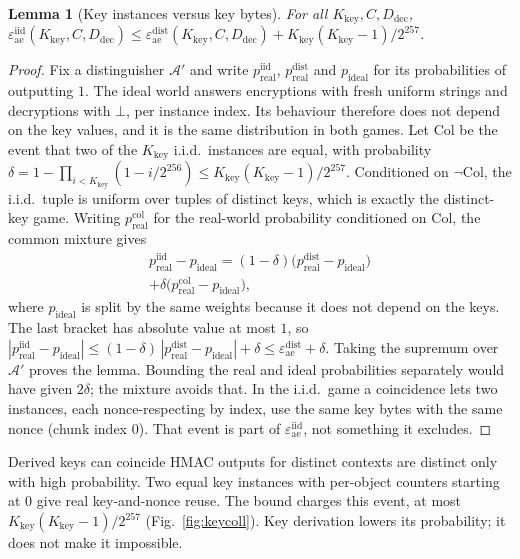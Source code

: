 \documentclass[pdflatex,sn-mathphys-num,twocolumn]{sn-jnl}
\theoremstyle{plain}
\newtheorem{lemma}[theorem]{Lemma}
\theoremstyle{definition}
\begin{document}
\begin{lemma}[Key instances versus key bytes]\label{lem:keycoll}
For all $K_{\mathrm{key}},C,D_{\mathrm{dec}}$, $\varepsilon^{\mathrm{iid}}_{\mathrm{ae}}(K_{\mathrm{key}},C,D_{\mathrm{dec}})\le\varepsilon^{\mathrm{dist}}_{\mathrm{ae}}(K_{\mathrm{key}},C,D_{\mathrm{dec}})+K_{\mathrm{key}}(K_{\mathrm{key}}-1)/2^{257}$.
\end{lemma}
\begin{proof}
Fix a distinguisher $\mathcal A'$ and write $p^{\mathrm{iid}}_{\mathrm{real}}$, $p^{\mathrm{dist}}_{\mathrm{real}}$ and $p_{\mathrm{ideal}}$ for its probabilities of outputting $1$. The ideal world answers encryptions with fresh uniform strings and decryptions with $\bot$, per instance index. Its behaviour therefore does not depend on the key values, and it is the same distribution in both games. Let $\mathrm{Col}$ be the event that two of the $K_{\mathrm{key}}$ i.i.d.\ instances are equal, with probability $\delta=1-\prod_{i<K_{\mathrm{key}}}(1-i/2^{256})\le K_{\mathrm{key}}(K_{\mathrm{key}}-1)/2^{257}$. Conditioned on $\neg\mathrm{Col}$, the i.i.d.\ tuple is uniform over tuples of distinct keys, which is exactly the distinct-key game. Writing $p^{\mathrm{col}}_{\mathrm{real}}$ for the real-world probability conditioned on $\mathrm{Col}$, the common mixture gives
\begin{multline*}
 p^{\mathrm{iid}}_{\mathrm{real}}-p_{\mathrm{ideal}}=(1-\delta)\big(p^{\mathrm{dist}}_{\mathrm{real}}-p_{\mathrm{ideal}}\big)\\
 +\delta\big(p^{\mathrm{col}}_{\mathrm{real}}-p_{\mathrm{ideal}}\big),
\end{multline*}
where $p_{\mathrm{ideal}}$ is split by the same weights because it does not depend on the keys. The last bracket has absolute value at most $1$, so $|p^{\mathrm{iid}}_{\mathrm{real}}-p_{\mathrm{ideal}}|\le(1-\delta)\,|p^{\mathrm{dist}}_{\mathrm{real}}-p_{\mathrm{ideal}}|+\delta\le\varepsilon^{\mathrm{dist}}_{\mathrm{ae}}+\delta$. Taking the supremum over $\mathcal A'$ proves the lemma. Bounding the real and ideal probabilities separately would have given $2\delta$; the mixture avoids that. In the i.i.d.\ game a coincidence lets two instances, each nonce-respecting by index, use the same key bytes with the same nonce (chunk index $0$). That event is part of $\varepsilon^{\mathrm{iid}}_{\mathrm{ae}}$, not something it excludes.
\end{proof}

\begin{warnbox}{Derived keys can coincide}
HMAC outputs for distinct contexts are distinct only with high probability. Two equal key instances with per-object counters starting at $0$ give real key-and-nonce reuse. The bound charges this event, at most $K_{\mathrm{key}}(K_{\mathrm{key}}-1)/2^{257}$ (Fig.~\ref{fig:keycoll}). Key derivation lowers its probability; it does not make it impossible.
\end{warnbox}
\end{document}
